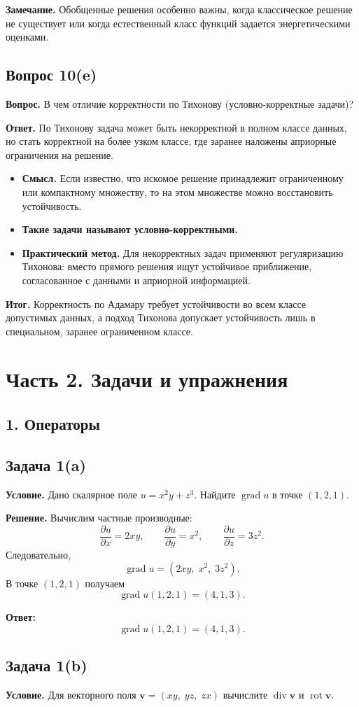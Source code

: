 \documentclass[a4paper,12pt]{article}
\newcommand{\grad}{\operatorname{grad}}
\newcommand{\diver}{\operatorname{div}}
\newcommand{\rot}{\operatorname{rot}}
\newcommand{\Question}[2]{\subsection*{Вопрос #1}\textbf{Вопрос.} #2}
\newcommand{\Answer}{\textbf{Ответ.}}
\newcommand{\Task}[2]{\subsection*{Задача #1}\textbf{Условие.} #2}
\newcommand{\Solution}{\textbf{Решение.}}
\begin{document}
\textbf{Замечание.} Обобщенные решения особенно важны, когда классическое решение не существует или когда естественный класс функций задается энергетическими оценками.

\Question{10(e)}{В чем отличие корректности по Тихонову (условно-корректные задачи)?}

\Answer
По Тихонову задача может быть некорректной в полном классе данных, но стать корректной на более узком классе, где заранее наложены априорные ограничения на решение.

\begin{itemize}
  \item \textbf{Смысл.} Если известно, что искомое решение принадлежит ограниченному или компактному множеству, то на этом множестве можно восстановить устойчивость.
  \item \textbf{Такие задачи называют условно-корректными.}
  \item \textbf{Практический метод.} Для некорректных задач применяют регуляризацию Тихонова: вместо прямого решения ищут устойчивое приближение, согласованное с данными и априорной информацией.
\end{itemize}

\textbf{Итог.} Корректность по Адамару требует устойчивости во всем классе допустимых данных, а подход Тихонова допускает устойчивость лишь в специальном, заранее ограниченном классе.

\clearpage
\section*{Часть 2. Задачи и упражнения}

\subsection*{1. Операторы}

\Task{1(a)}{Дано скалярное поле $u=x^2y+z^3$. Найдите $\grad u$ в точке $(1,2,1)$.}

\Solution
Вычислим частные производные:
\[
\frac{\partial u}{\partial x}=2xy, \qquad
\frac{\partial u}{\partial y}=x^2, \qquad
\frac{\partial u}{\partial z}=3z^2.
\]
Следовательно,
\[
\grad u=(2xy,\;x^2,\;3z^2).
\]
В точке $(1,2,1)$ получаем
\[
\grad u(1,2,1)=(4,1,3).
\]

\textbf{Ответ:}
\[
\grad u(1,2,1)=(4,1,3).
\]

\Task{1(b)}{Для векторного поля $\mathbf{v}=(xy,\;yz,\;zx)$ вычислите $\diver \mathbf{v}$ и $\rot \mathbf{v}$.}
\end{document}
